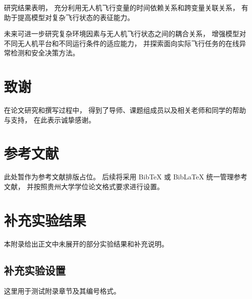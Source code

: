 \documentclass[
  degree=master,
  degree-type=academic
]{gzuthesis}
\begin{document}
研究结果表明，
充分利用无人机飞行变量的时间依赖关系和跨变量关联关系，
有助于提高模型对复杂飞行状态的表征能力。

未来可进一步研究复杂环境因素与无人机飞行状态之间的耦合关系，
增强模型对不同无人机平台和不同运行条件的适应能力，
并探索面向实际飞行任务的在线异常检测和安全决策方法。



\backmatter



\chapter*{致谢}

在论文研究和撰写过程中，
得到了导师、课题组成员以及相关老师和同学的帮助与支持，
在此表示诚挚感谢。



\chapter*{参考文献}

此处暂作为参考文献排版占位。
后续将采用 BibTeX 或 BibLaTeX 统一管理参考文献，
并按照贵州大学学位论文格式要求进行设置。



\appendix

\chapter{补充实验结果}

本附录给出正文中未展开的部分实验结果和补充说明。


\section{补充实验设置}

这里用于测试附录章节及其编号格式。
\end{document}
